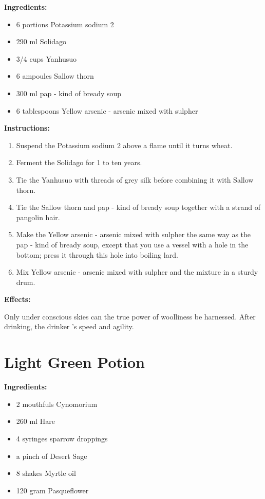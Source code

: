 \documentclass{article}
\begin{document}
\textbf{Ingredients:}

\begin{itemize}
  \item 6 portions Potassium sodium 2
  \item 290 ml Solidago
  \item 3/4 cups Yanhusuo
  \item 6 ampoules Sallow thorn
  \item 300 ml pap - kind of bready soup
  \item 6 tablespoons Yellow arsenic - arsenic mixed with sulpher
\end{itemize}

\textbf{Instructions:}

\begin{enumerate}
  \item Suspend the Potassium sodium 2 above a flame until it turns wheat.
  \item Ferment the Solidago for 1 to ten years.
  \item Tie the Yanhusuo with threads of grey silk before combining it with Sallow thorn.
  \item Tie the Sallow thorn and pap - kind of bready soup together with a strand of pangolin hair.
  \item Make the Yellow arsenic - arsenic mixed with sulpher the same way as the pap - kind of bready soup, except that you use a vessel with a hole in the bottom; press it through this hole into boiling lard.
  \item Mix Yellow arsenic - arsenic mixed with sulpher and the mixture in a sturdy drum.
\end{enumerate}

\textbf{Effects:}

Only under conscious skies can the true power of woolliness be harnessed. After drinking, the drinker 's speed and agility.

\newpage
\section*{Light Green Potion}

\textbf{Ingredients:}

\begin{itemize}
  \item 2 mouthfuls Cynomorium
  \item 260 ml Hare
  \item 4 syringes sparrow droppings
  \item a pinch of Desert Sage
  \item 8 shakes Myrtle oil
  \item 120 gram Pasqueflower
\end{itemize}
\end{document}
